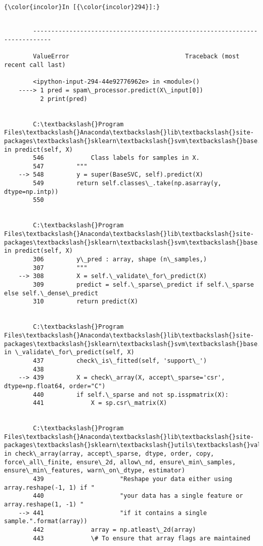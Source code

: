 \documentclass[11pt]{article}
\begin{document}
    \begin{Verbatim}[commandchars=\\\{\}]
{\color{incolor}In [{\color{incolor}294}]:} 
\end{Verbatim}


    \begin{Verbatim}[commandchars=\\\{\}]

        ---------------------------------------------------------------------------

        ValueError                                Traceback (most recent call last)

        <ipython-input-294-44e92776962e> in <module>()
    ----> 1 pred = spam\_processor.predict(X\_input[0])
          2 print(pred)
    

        C:\textbackslash{}Program Files\textbackslash{}Anaconda\textbackslash{}lib\textbackslash{}site-packages\textbackslash{}sklearn\textbackslash{}svm\textbackslash{}base.py in predict(self, X)
        546             Class labels for samples in X.
        547         """
    --> 548         y = super(BaseSVC, self).predict(X)
        549         return self.classes\_.take(np.asarray(y, dtype=np.intp))
        550 
    

        C:\textbackslash{}Program Files\textbackslash{}Anaconda\textbackslash{}lib\textbackslash{}site-packages\textbackslash{}sklearn\textbackslash{}svm\textbackslash{}base.py in predict(self, X)
        306         y\_pred : array, shape (n\_samples,)
        307         """
    --> 308         X = self.\_validate\_for\_predict(X)
        309         predict = self.\_sparse\_predict if self.\_sparse else self.\_dense\_predict
        310         return predict(X)
    

        C:\textbackslash{}Program Files\textbackslash{}Anaconda\textbackslash{}lib\textbackslash{}site-packages\textbackslash{}sklearn\textbackslash{}svm\textbackslash{}base.py in \_validate\_for\_predict(self, X)
        437         check\_is\_fitted(self, 'support\_')
        438 
    --> 439         X = check\_array(X, accept\_sparse='csr', dtype=np.float64, order="C")
        440         if self.\_sparse and not sp.isspmatrix(X):
        441             X = sp.csr\_matrix(X)
    

        C:\textbackslash{}Program Files\textbackslash{}Anaconda\textbackslash{}lib\textbackslash{}site-packages\textbackslash{}sklearn\textbackslash{}utils\textbackslash{}validation.py in check\_array(array, accept\_sparse, dtype, order, copy, force\_all\_finite, ensure\_2d, allow\_nd, ensure\_min\_samples, ensure\_min\_features, warn\_on\_dtype, estimator)
        439                     "Reshape your data either using array.reshape(-1, 1) if "
        440                     "your data has a single feature or array.reshape(1, -1) "
    --> 441                     "if it contains a single sample.".format(array))
        442             array = np.atleast\_2d(array)
        443             \# To ensure that array flags are maintained
    


\end{Verbatim}
\end{document}
